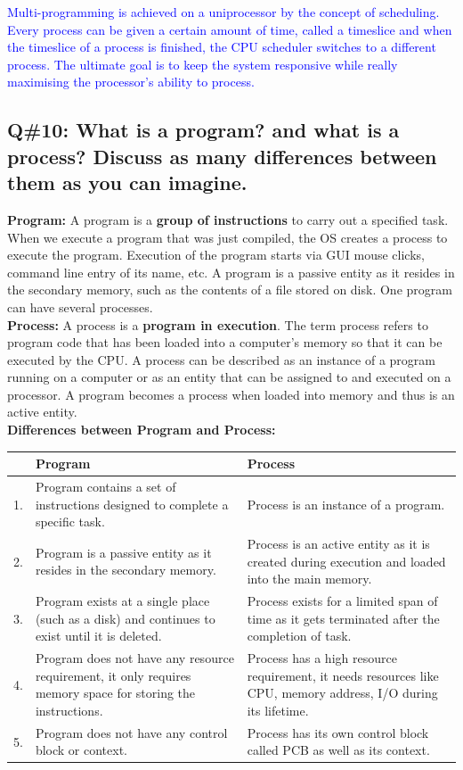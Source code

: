 \textcolor{blue}{Multi-programming is achieved on a uniprocessor by the concept of scheduling. Every process can be given a certain amount of time, called a timeslice and when the timeslice of a process is finished, the CPU scheduler switches to a different process. The ultimate goal is to keep the system responsive while really maximising the processor's ability to process.}

\subsection*{Q\#10: What is a program? and what is a process? Discuss as many differences between them as you can imagine.}

\textbf{Program:} A program is a \textbf{group of instructions} to carry out a specified task. When we execute a program that was just compiled, the OS creates a process to execute the program. Execution of the program starts via GUI mouse clicks, command line entry of its name, etc. A program is a passive entity as it resides in the secondary memory, such as the contents of a file stored on disk. One program can have several processes.\\
\textbf{Process:} A process is a \textbf{program in execution}. The term process refers to program code that has been loaded into a computer’s memory so that it can be executed by the CPU. A process can be described as an instance of a program running on a computer or as an entity that can be assigned to and executed on a processor. A program becomes a process when loaded into memory and thus is an active entity.\\

\textbf{Differences between Program and Process:}\\
\begin{tabularx}{\textwidth}{|c|X|X|}
\hline
&\textbf{Program} & \textbf{Process} \\
\hline
1. & Program contains a set of instructions designed to complete a specific task. & Process is an instance of a program. \\
\hline
2. & Program is a passive entity as it resides in the secondary memory. & Process is an active entity as it is created during execution and loaded into the main memory. \\
\hline
3. & Program exists at a single place (such as a disk) and continues to exist until it is deleted. & Process exists for a limited span of time as it gets terminated after the completion of task. \\
\hline
4. & Program does not have any resource requirement, it only requires memory space for storing the instructions. & Process has a high resource requirement, it needs resources like CPU, memory address, I/O during its lifetime. \\
\hline
5. & Program does not have any control block or context. & Process has its own control block called PCB as well as its context. \\
\hline
\end{tabularx}



